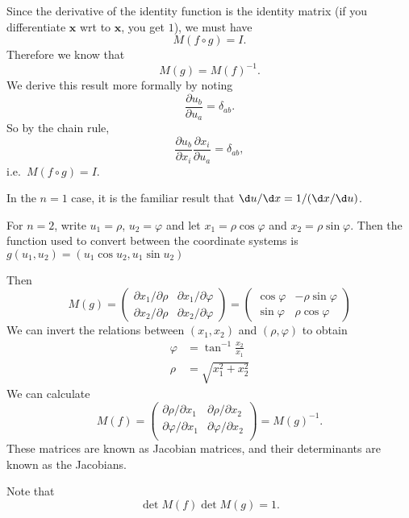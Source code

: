 \documentclass[a4paper]{article}
\begin{document}
Since the derivative of the identity function is the identity matrix (if you differentiate $\mathbf{x}$ wrt to $\mathbf{x}$, you get $1$), we must have
\[
  M(f\circ g) = I.
\]
Therefore we know that
\[
  M(g) = M(f)^{-1}.
\]
We derive this result more formally by noting
\[
  \frac{\partial u_b}{\partial u_a} = \delta_{ab}.
\]
So by the chain rule,
\[
  \frac{\partial u_b}{\partial x_i}\frac{\partial x_i}{\partial u_a} = \delta_{ab},
\]
i.e.\ $M(f\circ g) = I$.

In the $n = 1$ case, it is the familiar result that $\d u/\d x = 1/(\d x/\d u)$.

\begin{eg}
  For $n = 2$, write $u_1 = \rho$, $u_2 =\varphi$ and let $x_1 = \rho \cos \varphi$ and $x_2 = \rho \sin \varphi$. Then the function used to convert between the coordinate systems is $g(u_1, u_2) = (u_1\cos u_2, u_1\sin u_2)$

  Then
  \[
    M(g) =
    \begin{pmatrix}
      \partial x_1/\partial \rho & \partial x_1/\partial \varphi\\
      \partial x_2/\partial \rho & \partial x_2/\partial \varphi
    \end{pmatrix}
    =
    \begin{pmatrix}
      \cos\varphi & -\rho\sin \varphi\\
      \sin \varphi & \rho \cos \varphi
    \end{pmatrix}
  \]
  We can invert the relations between $(x_1, x_2)$ and $(\rho, \varphi)$ to obtain
  \begin{align*}
    \varphi &= \tan^{-1} \frac{x_2}{x_1}\\
    \rho &= \sqrt{x_1^2 + x_2^2}
  \end{align*}
  We can calculate
  \[
    M(f) =
    \begin{pmatrix}
      \partial\rho/\partial x_1 & \partial\rho/\partial x_2\\
      \partial\varphi/\partial x_1 & \partial\varphi/\partial x_2\\
    \end{pmatrix}
    = M(g)^{-1}.
  \]
  These matrices are known as Jacobian matrices, and their determinants are known as the Jacobians.
\end{eg}
Note that
\[
  \det M(f)\det M(g) = 1.
\]
\end{document}
